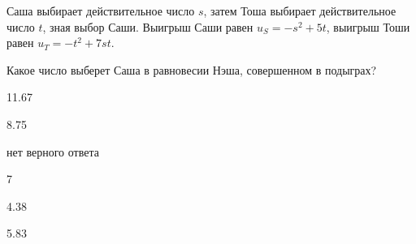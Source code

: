 
\begin{question}
Саша выбирает действительное число \(s\), затем Тоша выбирает
действительное число \(t\), зная выбор Саши. Выигрыш Саши равен
\(u_S = -s^2 + 5t\), выигрыш Тоши равен \(u_T = -t^2 + 7 st\).

Какое число выберет Саша в равновесии Нэша, совершенном в подыграх?
\begin{answerlist}
  \item 11.67
  \item 8.75
  \item нет верного ответа
  \item 7
  \item 4.38
  \item 5.83
\end{answerlist}
\end{question}


